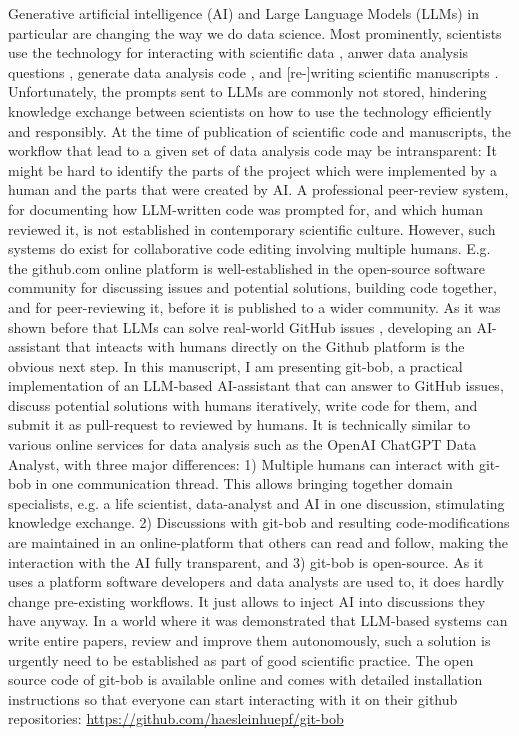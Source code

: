 \documentclass{ecai}
\begin{document}
Generative artificial intelligence (AI) and Large Language Models (LLMs) in particular are changing the way we do data science. Most prominently, scientists use the technology for interacting with scientific data \citep{Royer2023}, anwer data analysis questions \citep{Lai2022DS1000, lei2024bioimage}, generate data analysis code \citep{royer2023omega, benchmark_llm_bia, chen2021evaluating}, and [re-]writing scientific manuscripts \citep{lu2024aiscientist}. Unfortunately, the prompts sent to LLMs are commonly not stored, hindering knowledge exchange between scientists on how to use the technology efficiently and responsibly. At the time of publication of scientific code and manuscripts, the workflow that lead to a given set of data analysis code may be intransparent: It might be hard to identify the parts of the project which were implemented by a human and the parts that were created by AI. A professional peer-review system, for documenting how LLM-written code was prompted for, and which human reviewed it, is not established in contemporary scientific culture. However, such systems do exist for collaborative code editing involving multiple humans. E.g. the github.com online platform is well-established in the open-source software community for discussing issues and potential solutions, building code together, and for peer-reviewing it, before it is published to a wider community. As it was shown before that LLMs can solve real-world GitHub issues \citep{jimenez2024swebenchlanguagemodelsresolve}, developing an AI-assistant that inteacts with humans directly on the Github platform is the obvious next step. In this manuscript, I am presenting git-bob, a practical implementation of an LLM-based AI-assistant that can answer to GitHub issues, discuss potential solutions with humans iteratively, write code for them, and submit it as pull-request to reviewed by humans. It is technically similar to various online services for data analysis such as the OpenAI ChatGPT Data Analyst, with three major differences: 1) Multiple humans can interact with git-bob in one communication thread. This allows bringing together domain specialists, e.g. a life scientist, data-analyst and AI in one discussion, stimulating knowledge exchange. 2) Discussions with git-bob and resulting code-modifications are maintained in an online-platform that others can read and follow, making the interaction with the AI fully transparent, and 3) git-bob is open-source. As it uses a platform software developers and data analysts are used to, it does hardly change pre-existing workflows. It just allows to inject AI into discussions they have anyway. In a world where it was demonstrated that LLM-based systems can write entire papers, review and improve them \citep{lu2024aiscientist} autonomously, such a solution is urgently need to be established as part of good scientific practice. The open source code of git-bob is available online and comes with detailed installation instructions so that everyone can start interacting with it on their github repositories: \url{https://github.com/haesleinhuepf/git-bob}
\end{document}
